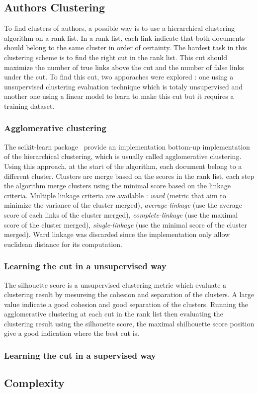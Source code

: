 \subsection{Authors Clustering}

To find clusters of authors, a possible way is to use a hierarchical clustering algorithm on a rank list.
In a rank list, each link indicate that both documents should belong to the same cluster in order of certainty.
The hardest task in this clustering scheme is to find the right cut in the rank list.
This cut should maximize the number of true links above the cut and the number of false links under the cut.
To find this cut, two apporaches were explored : one using a unsupervised clustering evaluation technique which is totaly unsupervised and another one using a linear model to learn to make this cut but it requires a training dataset.

\subsubsection{Agglomerative clustering}

The scikit-learn package~\cite{sklearn} provide an implementation bottom-up implementation of the hierarchical clustering, which is usually called agglomerative clustering.
Using this approach, at the start of the algorithm, each document belong to a different cluster.
Clusters are merge based on the scores in the rank list, each step the algorithm merge clusters using the minimal score based on the linkage criteria.
Multiple linkage criteria are available : \textit{ward} (metric that aim to minimize the variance of the cluster merged), \textit{average-linkage} (use the average score of each links of the cluster merged), \textit{complete-linkage} (use the maximal score of the cluster merged), \textit{single-linkage} (use the minimal score of the cluster merged).
Ward linkage was discarded since the implementation only allow euclidean distance for its computation.

\subsubsection{Learning the cut in a unsupervised way}

The silhouette score is a unsupervised clustering metric which evaluate a clustering result by mesureing the cohesion and separation of the clusters.
A large value indicate a good cohesion and good separation of the clusters.
Running the agglomerative clustering at each cut in the rank list then evaluating the clustering result using the silhouette score, the maximal shilhouette score position give a good indication where the best cut is.

\subsubsection{Learning the cut in a supervised way}



\subsection{Complexity}
